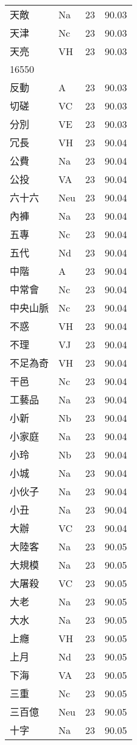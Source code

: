 \documentclass[twocolumn]{book}
\begin{document}
\begin{supertabular}{llrr}
天敵 & Na & 23 &  90.03\\
天津 & Nc & 23 &  90.03\\
天亮 & VH & 23 &  90.03\\
16550\\
反動 & A & 23 &  90.03\\
切磋 & VC & 23 &  90.03\\
分別 & VE & 23 &  90.03\\
冗長 & VH & 23 &  90.04\\
公費 & Na & 23 &  90.04\\
公投 & VA & 23 &  90.04\\
六十六 & Neu & 23 &  90.04\\
內褲 & Na & 23 &  90.04\\
五專 & Nc & 23 &  90.04\\
五代 & Nd & 23 &  90.04\\
中階 & A & 23 &  90.04\\
中常會 & Nc & 23 &  90.04\\
中央山脈 & Nc & 23 &  90.04\\
不惑 & VH & 23 &  90.04\\
不理 & VJ & 23 &  90.04\\
不足為奇 & VH & 23 &  90.04\\
干邑 & Nc & 23 &  90.04\\
工藝品 & Na & 23 &  90.04\\
小新 & Nb & 23 &  90.04\\
小家庭 & Na & 23 &  90.04\\
小玲 & Nb & 23 &  90.04\\
小城 & Na & 23 &  90.04\\
小伙子 & Na & 23 &  90.04\\
小丑 & Na & 23 &  90.04\\
大辦 & VC & 23 &  90.04\\
大陸客 & Na & 23 &  90.05\\
大規模 & Na & 23 &  90.05\\
大屠殺 & VC & 23 &  90.05\\
大老 & Na & 23 &  90.05\\
大水 & Na & 23 &  90.05\\
上癮 & VH & 23 &  90.05\\
上月 & Nd & 23 &  90.05\\
下海 & VA & 23 &  90.05\\
三重 & Nc & 23 &  90.05\\
三百億 & Neu & 23 &  90.05\\
十字 & Na & 23 &  90.05\\

\end{supertabular}
\end{document}
